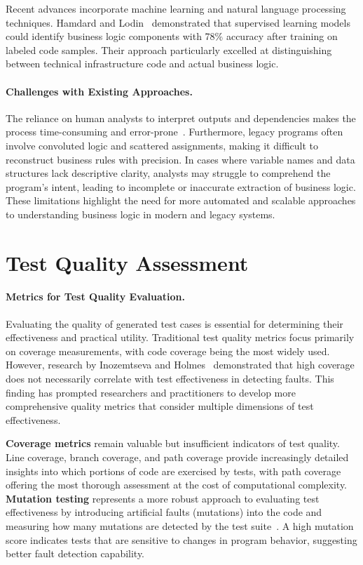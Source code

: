 \hspace{0.5cm} Recent advances incorporate machine learning and natural language processing techniques. Hamdard and Lodin~\cite{MLBusinessLogic} demonstrated that supervised learning models could identify business logic components with 78\% accuracy after training on labeled code samples. Their approach particularly excelled at distinguishing between technical infrastructure code and actual business logic.

\paragraph{Challenges with Existing Approaches.} The reliance on human analysts to interpret outputs and dependencies makes the process time-consuming and error-prone~\cite{BusinessRules}. Furthermore, legacy programs often involve convoluted logic and scattered assignments, making it difficult to reconstruct business rules with precision. In cases where variable names and data structures lack descriptive clarity, analysts may struggle to comprehend the program's intent, leading to incomplete or inaccurate extraction of business logic. These limitations highlight the need for more automated and scalable approaches to understanding business logic in modern and legacy systems.

\section{Test Quality Assessment}

\paragraph{Metrics for Test Quality Evaluation.} Evaluating the quality of generated test cases is essential for determining their effectiveness and practical utility. Traditional test quality metrics focus primarily on coverage measurements, with code coverage being the most widely used. However, research by Inozemtseva and Holmes~\cite{TestCoverageLimitations} demonstrated that high coverage does not necessarily correlate with test effectiveness in detecting faults. This finding has prompted researchers and practitioners to develop more comprehensive quality metrics that consider multiple dimensions of test effectiveness.

\hspace{0.5cm} \textbf{Coverage metrics} remain valuable but insufficient indicators of test quality. Line coverage, branch coverage, and path coverage provide increasingly detailed insights into which portions of code are exercised by tests, with path coverage offering the most thorough assessment at the cost of computational complexity. \textbf{Mutation testing} represents a more robust approach to evaluating test effectiveness by introducing artificial faults (mutations) into the code and measuring how many mutations are detected by the test suite~\cite{MutationTesting}. A high mutation score indicates tests that are sensitive to changes in program behavior, suggesting better fault detection capability.

